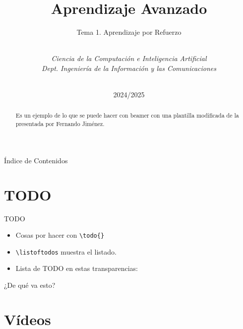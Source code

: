 \documentclass[10pt, envcountsect, presentation, aspectratio=43]{beamer}
\title[Aprendizaje Avanzado]{Aprendizaje Avanzado}
\subtitle{Tema 1. Aprendizaje por Refuerzo} %
\author[L. D. Hernández] %
{%
	\sc{Luis Daniel Hernández Molinero }\\ %
	\textit{Ciencia de la Computación e Inteligencia Artificial}\\  %
	\textit{Dept. Ingeniería de la Información y las Comunicaciones}\\  %
	\\   %
}
\institute[DIIC]%
{
	\textit{Universidad de Murcia}
}
\date{2024/2025} %
\begin{document}
	



\begin{frame}[plain]
	\titlepage
\end{frame}


\begin{frame}{Índice de Contenidos}
	\tableofcontents 
\end{frame}



\section{TODO}


\begin{frame}[fragile]{TODO}

\begin{itemize}
\item Cosas por hacer con \verb!\todo{}!
\item \verb!\listoftodos!  muestra el listado.
\item Lista de TODO en estas transparencias:

\listoftodos
\end{itemize}


\end{frame}



\begin{frame}{¿De qué va esto?}



\begin{abstract}
Es un ejemplo de lo que se puede hacer con beamer con una plantilla modificada de la presentada por Fernando Jiménez.
\end{abstract}



\end{frame}






\section{Vídeos}
\end{document}
